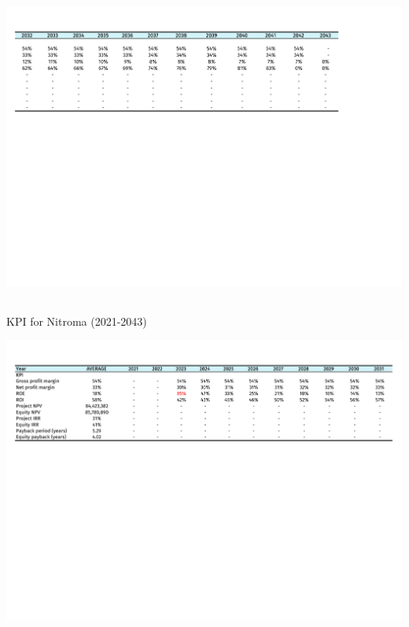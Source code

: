 \begin{landscape}
\begin{table}
\includegraphics[clip, trim=0cm 5cm 0cm 0cm, width=\linewidth]{chapters/Z-support/attachments/KPI2.pdf}
\end{table}

\subsection{}
\begin{table}
\label{tab:Cash Flow}
  \caption{KPI for Nitroma (2021-2043)}
\includegraphics[clip, trim=0cm 5cm 0cm 0cm, width=\linewidth]{chapters/Z-support/attachments/KPI1.pdf}
\end{table}

\end{landscape}


